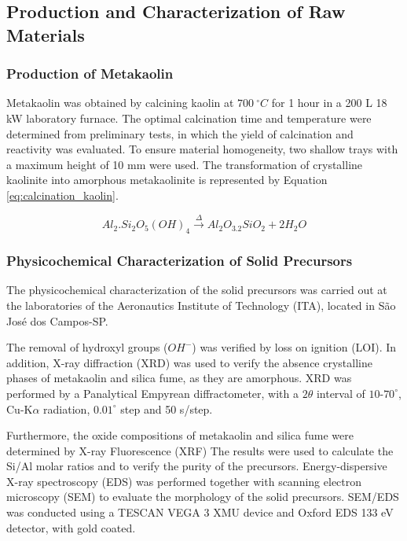 \subsection{Production and Characterization of Raw Materials}
\label{sec:production_characterization_raw_materials}

\subsubsection{Production of Metakaolin}
\label{sec:production_of_metakaolin}

Metakaolin was obtained by calcining kaolin at $700\ ^\circ C$ for 1 hour in a 200 L 18 kW laboratory furnace.
The optimal calcination time and temperature were determined from preliminary tests, in which the yield of calcination and reactivity was evaluated.
To ensure material homogeneity, two shallow trays with a maximum height of 10 mm were used.
The transformation of crystalline kaolinite into amorphous metakaolinite is represented by Equation \ref{eq:calcination_kaolin}.

\begin{equation}
    \label{eq:calcination_kaolin}
        Al_2.Si_2O_5\left(OH\right)_4 \xrightarrow{\Delta} Al_2O_3.2SiO_2 + 2 H_2O
\end{equation}

\subsubsection{Physicochemical Characterization of Solid Precursors}
\label{sec:physicochemical_characterization_precursors}

The physicochemical characterization of the solid precursors was carried out at the laboratories of the Aeronautics Institute of Technology (ITA), located in São José dos Campos-SP.

The removal of hydroxyl groups ($OH^-$) was verified by loss on ignition (LOI).
In addition, X-ray diffraction (XRD) was used to verify the absence crystalline phases of metakaolin and silica fume, as they are amorphous.
XRD was performed by a Panalytical Empyrean diffractometer, with a $2\theta$ interval of $10$-$70^\circ$, Cu-$\mathrm{K}\alpha$ radiation, $0.01^\circ$ step and 50 s/step.


Furthermore, the oxide compositions of metakaolin and silica fume were determined by X-ray Fluorescence (XRF)
The results were used to calculate the Si/Al molar ratios and to verify the purity of the precursors.
Energy-dispersive X-ray spectroscopy (EDS) was performed together with scanning electron microscopy (SEM) to evaluate the morphology of the solid precursors.
SEM/EDS was conducted using a TESCAN VEGA 3 XMU device and Oxford EDS 133 eV detector, with gold coated.

